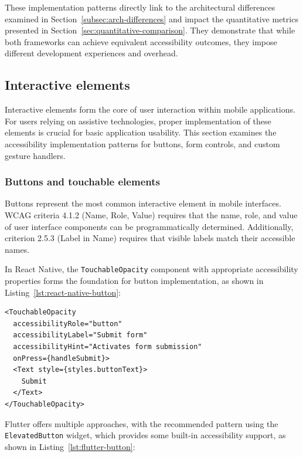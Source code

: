 {These implementation patterns directly link to the architectural differences examined in Section~\ref{subsec:arch-differences} and impact the quantitative metrics presented in Section~\ref{sec:quantitative-comparison}. They demonstrate that while both frameworks can achieve equivalent accessibility outcomes, they impose different development experiences and overhead.

\subsection{Interactive elements}
\label{subsec:interactive-elements}

Interactive elements form the core of user interaction within mobile applications. For users relying on assistive technologies, proper implementation of these elements is crucial for basic application usability. This section examines the accessibility implementation patterns for buttons, form controls, and custom gesture handlers.

\subsubsection{Buttons and touchable elements}
\label{subsubsec:buttons-implementation}

Buttons represent the most common interactive element in mobile interfaces. WCAG criteria 4.1.2 (Name, Role, Value) requires that the name, role, and value of user interface components can be programmatically determined. Additionally, criterion 2.5.3 (Label in Name) requires that visible labels match their accessible names.

In React Native, the \texttt{TouchableOpacity} component with appropriate accessibility properties forms the foundation for button implementation, as shown in Listing~\ref{lst:react-native-button}:

\begin{lstlisting}[style=ReactNativeStyle, caption=Accessible button in React Native, label=lst:react-native-button]
<TouchableOpacity
  accessibilityRole="button"
  accessibilityLabel="Submit form"
  accessibilityHint="Activates form submission"
  onPress={handleSubmit}>
  <Text style={styles.buttonText}>
    Submit
  </Text>
</TouchableOpacity>
\end{lstlisting}

Flutter offers multiple approaches, with the recommended pattern using the \texttt{ElevatedButton} widget, which provides some built-in accessibility support, as shown in Listing~\ref{lst:flutter-button}:

}
